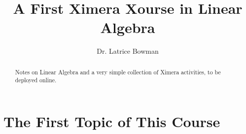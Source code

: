 \documentclass{xourse}
\author{Dr. Latrice Bowman}
\title{A First Ximera Xourse in Linear Algebra}
\begin{document}
\begin{abstract}
    Notes on Linear Algebra and a very simple collection of Ximera activities, 
    to be deployed online.
\end{abstract}
\maketitle
\part{The First Topic of This Course}
\chapterstyle
{}
\sectionstyle
{}
\chapterstyle
{}
\end{document}
